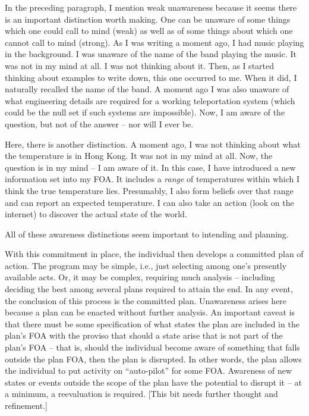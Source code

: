 \documentclass[
11pt,
titlepage,
reqno,
]{article}%
\theoremstyle{definition}
\begin{document}
In the preceding paragraph, I mention weak unawareness because it seems there is an important distinction worth making. One can be unaware of some things which one could call to mind (weak) as well as of some things about which one cannot call to mind (strong). As I was writing a moment ago, I had music playing in the background. I was unaware of the name of the band playing the music. It was not in my mind at all. I was not thinking about it. Then, as I started thinking about examples to write down, this one occurred to me. When it did, I naturally recalled the name of the band. A moment ago I was also unaware of what engineering details are required for a working teleportation system (which could be the null set if such systems are impossible). Now, I am aware of the question, but not of the answer -- nor will I ever be. 

Here, there is another distinction. A moment ago, I was not thinking about what the temperature is in Hong Kong. It was not in my mind at all. Now, the question is in my mind -- I am aware of it.  In this case, I have introduced a new information set into my FOA. It includes a \textit{range} of temperatures within which I think the true temperature lies. Presumably, I also form beliefs over that range and can report an expected temperature. I can also take an action (look on the internet) to discover the actual state of the world. 

All of these awareness distinctions seem important to intending and planning.  

With this commitment in place, the individual then develops a committed plan of action. The program may be simple, i.e., just selecting among one's presently available acts. Or, it may be complex, requiring much analysis -- including deciding the best among several plans required to attain the end. In any event, the conclusion of this process is the committed plan. Unawareness arises here because a plan can be enacted without further analysis. An important caveat is that there must be some specification of what states the plan are included in the plan's FOA with the proviso that should a state arise that is not part of the plan's FOA -- that is, should the individual become aware of something that falls outside the plan FOA, then the plan is disrupted. In other words, the plan allows the individual to put activity on ``auto-pilot'' for some FOA. Awareness of new states or events outside the scope of the plan have the potential to disrupt it -- at a minimum, a reevaluation is required. [This bit needs further thought and refinement.]
\end{document}
